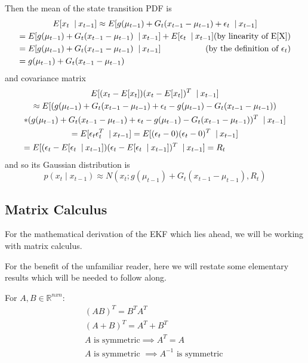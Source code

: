 Then the mean of the state transition PDF is
\begin{multline*}
E[x_t\ \mathbin{\vert} x_{t-1}] \approx E[g(\mu_{t-1}) + G_t (x_{t-1} - \mu_{t-1}) + \epsilon_t\ \mathbin{\vert} x_{t-1}] \\
= E[g(\mu_{t-1}) + G_t (x_{t-1} - \mu_{t-1})\ \mathbin{\vert} x_{t-1}] + E[\epsilon_t\ \mathbin{\vert} x_{t-1}] \hfill \text{(by linearity of E[X])} \\
= E[g(\mu_{t-1}) + G_t (x_{t-1} - \mu_{t-1})\ \mathbin{\vert} x_{t-1}] \hfill \text{(by the definition of \(\epsilon_t\))} \\
= g(\mu_{t-1}) + G_t (x_{t-1} - \mu_{t-1}) \hfill
\end{multline*}
and covariance matrix
\begin{multline*}
E[(x_t - E[x_t])(x_t - E[x_t])^T\ \mathbin{\vert} x_{t-1}] \\ \approx E[(g(\mu_{t-1}) + G_t (x_{t-1} - \mu_{t-1}) + \epsilon_t - g(\mu_{t-1}) - G_t (x_{t-1} - \mu_{t-1})) \\
* (g(\mu_{t-1}) + G_t (x_{t-1} - \mu_{t-1}) + \epsilon_t - g(\mu_{t-1}) - G_t (x_{t-1} - \mu_{t-1}))^T\ \mathbin{\vert} x_{t-1}] \\
= E[\epsilon_t \epsilon_t^T\ \mathbin{\vert} x_{t-1}] = E[(\epsilon_t - 0)(\epsilon_t - 0)^T\ \mathbin{\vert} x_{t-1}] \\
= E[(\epsilon_t - E[\epsilon_t\ \mathbin{\vert} x_{t-1}])(\epsilon_t - E[\epsilon_t\ \mathbin{\vert} x_{t-1}])^T\ \mathbin{\vert} x_{t-1}] = R_t \hfill
\end{multline*}
and so its Gaussian distribution is
\begin{equation} \label{eqStateTransitionNormalDef}
p(x_t \mathbin{\vert} x_{t-1}) \approx N(x_t;g(\mu_{t-1}) + G_t (x_{t-1} - \mu_{t-1}),R_t)
\end{equation}

\subsection{Matrix Calculus}
For the mathematical derivation of the EKF which lies ahead, we will be working with matrix calculus.

For the benefit of the unfamiliar reader, here we will restate some elementary results which will be needed to follow along.

For \(A,B \in \mathbb{R}^{nxn}\):
\begin{gather}
(AB)^T = B^T A^T \\
(A+B)^T = A^T + B^T \\
A \text{ is symmetric} \implies A^T = A \\
A \text{ is symmetric } \implies A^{-1} \text{ is symmetric } 
\end{gather}

